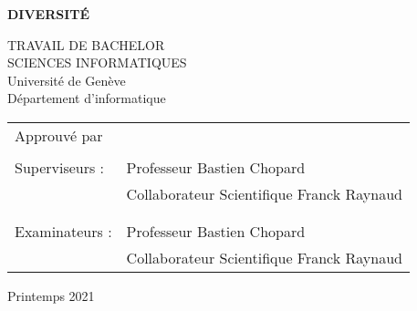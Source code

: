 \thispagestyle{empty}

\vspace*{+5em}
\begin{center}
	\textbf{DIVERSITÉ}\\
	\vspace*{+4em}

	\vspace{+2em}
	TRAVAIL DE BACHELOR\\
	SCIENCES INFORMATIQUES\\

	\vspace*{+3em}
	Université de Genève\\
	Département d'informatique\\
	\vspace*{+2em}

\end{center}

\begin{tabular}{ l l }
	Approuvé par  &                                           \\
	              &                                           \\
	Superviseurs : & Professeur Bastien Chopard                \\
	              & Collaborateur Scientifique Franck Raynaud \\
	              &                                           \\
	              &                                           \\
	Examinateurs : & Professeur Bastien Chopard                \\
	              & Collaborateur Scientifique Franck Raynaud \\
\end{tabular}

\vspace*{+4em}

\begin{center}
	Printemps 2021
\end{center}


